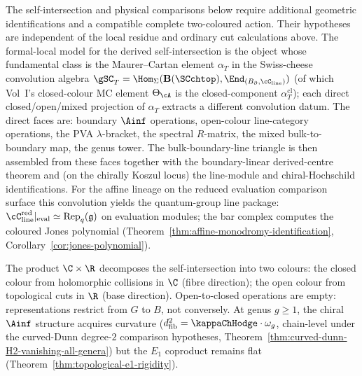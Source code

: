 The self-intersection and physical comparisons below require
additional geometric identifications and a compatible complete
two-coloured action. Their hypotheses are independent of the
local residue and ordinary cut calculations above.
The formal-local model for the derived self-intersection is the
object whose fundamental class is the Maurer--Cartan element
$\alpha_T$ in the Swiss-cheese convolution algebra
$\gSC_T = \Hom_\Sigma(\mathbf B(\SCchtop), \End_{(\Bbound,
\cC_{\mathrm{line}})})$ (of which Vol~I's closed-colour MC element
$\Theta_\cA$ is the closed-component $\alpha_T^{\mathrm{cl}}$);
each direct closed/open/mixed projection of $\alpha_T$ extracts
a different convolution datum. The direct faces are: boundary
$\Ainf$ operations, open-colour line-category operations, the
PVA $\lambda$-bracket, the spectral $R$-matrix, the mixed
bulk-to-boundary map, the genus tower. The bulk-boundary-line
triangle is then assembled from these faces together with the
boundary-linear derived-centre theorem and (on the chirally
Koszul locus) the line-module and chiral-Hochschild
identifications. For the affine lineage on the reduced
evaluation comparison surface this convolution yields the
quantum-group line package:
$\cC_{\mathrm{line}}^{\mathrm{red}}|_{\mathrm{eval}} \simeq
\operatorname{Rep}_q(\fg)$ on evaluation modules; the bar
complex computes the coloured Jones polynomial
(Theorem~\ref{thm:affine-monodromy-identification},
Corollary~\ref{cor:jones-polynomial}).

The product $\C \times \R$ decomposes the self-intersection into
two colours: the closed colour from holomorphic collisions in
$\C$ (fibre direction); the open colour from topological cuts
in $\R$ (base direction). Open-to-closed operations are empty:
representations restrict from $G$ to $B$, not conversely. At
genus $g \ge 1$, the chiral $\Ainf$ structure acquires curvature
($d^2_{\mathrm{fib}} = \kappaChHodge \cdot \omega_g$,
chain-level under the curved-Dunn degree-$2$ comparison hypotheses,
Theorem~\ref{thm:curved-dunn-H2-vanishing-all-genera}) but the
$E_1$ coproduct remains flat
(Theorem~\ref{thm:topological-e1-rigidity}).

